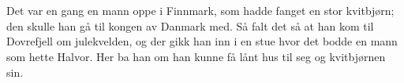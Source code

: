 \chapter*{\norwegianabstractname}
%
Det var en gang en mann oppe i Finnmark, som hadde fanget en stor kvitbjørn; den skulle han gå til kongen av Danmark med. Så falt det så at han kom til Dovrefjell om julekvelden, og der gikk han inn i en stue hvor det bodde en mann som hette Halvor. Her ba han om han kunne få lånt hus til seg og kvitbjørnen sin.
%
\newpage
